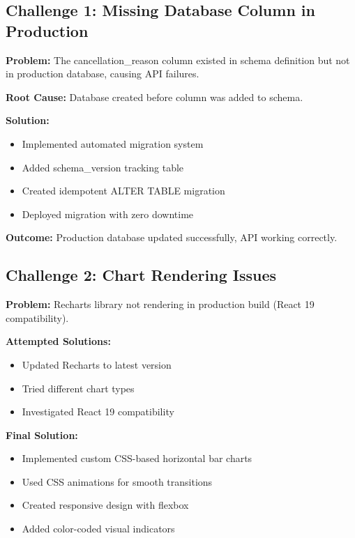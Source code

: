 \documentclass[12pt,a4paper]{article}
\begin{document}
\subsection{Challenge 1: Missing Database Column in Production}

\textbf{Problem:} The cancellation\_reason column existed in schema definition but not in production database, causing API failures.

\textbf{Root Cause:} Database created before column was added to schema.

\textbf{Solution:}
\begin{itemize}[leftmargin=*]
    \item Implemented automated migration system
    \item Added schema\_version tracking table
    \item Created idempotent ALTER TABLE migration
    \item Deployed migration with zero downtime
\end{itemize}

\textbf{Outcome:} Production database updated successfully, API working correctly.

\subsection{Challenge 2: Chart Rendering Issues}

\textbf{Problem:} Recharts library not rendering in production build (React 19 compatibility).

\textbf{Attempted Solutions:}
\begin{itemize}[leftmargin=*]
    \item Updated Recharts to latest version
    \item Tried different chart types
    \item Investigated React 19 compatibility
\end{itemize}

\textbf{Final Solution:}
\begin{itemize}[leftmargin=*]
    \item Implemented custom CSS-based horizontal bar charts
    \item Used CSS animations for smooth transitions
    \item Created responsive design with flexbox
    \item Added color-coded visual indicators
\end{itemize}
\end{document}
